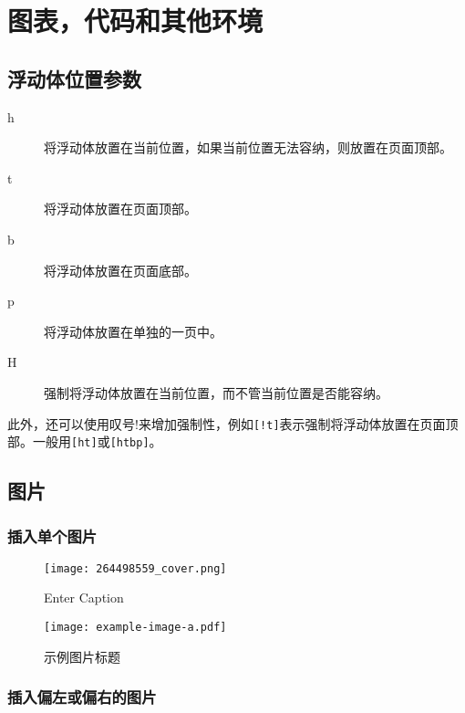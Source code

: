 
\chapter{图表，代码和其他环境}

\section{浮动体位置参数}
\begin{description}
  \item[h] 将浮动体放置在当前位置，如果当前位置无法容纳，则放置在页面顶部。
  \item[t] 将浮动体放置在页面顶部。
  \item[b] 将浮动体放置在页面底部。
  \item[p] 将浮动体放置在单独的一页中。
  \item[H] 强制将浮动体放置在当前位置，而不管当前位置是否能容纳。
\end{description}
此外，还可以使用叹号!来增加强制性，例如\verb|[!t]|表示强制将浮动体放置在页面顶部。一般用\verb|[ht]|或\verb|[htbp]|。

\section{图片}

\subsection{插入单个图片}
\begin{figure}[ht]
    \centering
    \texttt{[image: 264498559\_cover.png]}
    \caption{Enter Caption}
    \label{fig:enter-label}
\end{figure}

\begin{figure}[ht]
  \centering
  \texttt{[image: example-image-a.pdf]}
  \caption{示例图片标题}
  \label{fig:example}
\end{figure}

\subsection{插入偏左或偏右的图片}

